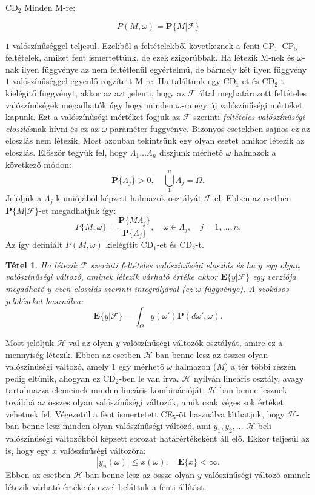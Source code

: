 \documentclass{article}
\newtheorem{theorem}{Tétel}
\begin{document}
CD$_2$ Minden M-re:

\[
 P(M,\omega) = \mathrm{\textbf{P}} \{ M|\mathscr{F}\}
\]

$1$ valószínűséggel teljesül. Ezekből a feltételekből következnek a fenti CP$_1$--CP$_5$ feltételek, amiket fent ismertettünk, de ezek szigorúbbak. Ha létezik M-nek és $\omega$-nak ilyen függvénye az nem feltétlenül egyértelmű, de bármely két ilyen függvény $1$ valószínűséggel egyenlő rögzített M-re. Ha találtunk egy CD$_1$-et és CD$_2$-t kielégítő függvényt, akkor az azt jelenti, hogy az $\mathscr{F}$ által meghatározott feltételes valószínűségek megadhatók úgy hogy minden $\omega$-ra egy új valószínűségi mértéket kapunk. Ezt a valószínűségi mértéket fogjuk az $\mathscr{F}$ szerinti \textit{feltételes valószínűségi eloszlás}nak hívni és ez az $\omega$ paraméter függvénye. Bizonyos esetekben sajnos ez az eloszlás nem létezik. Most azonban tekintsünk egy olyan esetet amikor létezik az eloszlás. Először tegyük fel, hogy $\Lambda_1 \ldots \Lambda_n$ diszjunk mérhető $\omega$ halmazok a következő módon:
\[
	\mathrm{\textbf{P}}\{\Lambda_j\} > 0, \quad \bigcup^{n}_1 \Lambda_j = \Omega .
\]
Jelöljük a $\Lambda_j$-k uniójából képzett halmazok osztályát $\mathscr{F}$-el. Ebben az esetben $\mathrm{\textbf{P}} \{ M|\mathscr{F}\}$-et megadhatjuk így:
\[
	P\{M,\omega\} = \frac{\mathrm{\textbf{P}}\{M\Lambda_j\}}{\mathrm{\textbf{P}}\{\Lambda_j\}}, \quad \omega \in \Lambda_j, \quad j = 1, \ldots , n .
\]
Az így definiált $P(M,\omega)$ kielégítit CD$_1$-et és CD$_2$-t. 
\begin{theorem}\label{th:t9-1}
	Ha létezik $\mathscr{F}$ szerinti feltételes valószínűségi eloszlás és ha $y$ egy olyan valószínűségi változó, aminek létezik várható értéke akkor $\mathrm{\textbf{E}}\{y|\mathscr{F}\}$ egy verziója megadható $y$ ezen eloszlás szerinti integráljával (ez $\omega$ függvénye). A szokásos jelöléseket használva: 
\begin{equation}
	\mathrm{\textbf{E}}\{y | \mathscr{F}\} = \int_{\Omega} y(\omega') \mathrm{\textbf{P}}(d\omega',\omega).
\end{equation}
\end{theorem}
Most jelöljük $\mathscr{H}$-val az olyan $y$ valószínűségi változók osztályát, amire ez a mennyiség létezik. Ebben az esetben $\mathscr{H}$-ban benne lesz az összes olyan valószínűségi változó, amely $1$ egy mérhető $\omega$ halmazon ($M$) a tér többi részén pedig eltűnik, ahogyan ez CD$_2$-ben le van írva. $\mathscr{H}$ nyilván lineáris osztály, avagy tartalmazza elemeinek minden lineáris kombinációját. $\mathscr{H}$-ban benne lesznek továbbá az összes olyan valószínűségi változók, amik csak véges sok értéket vehetnek fel. Végezetül a fent ismertetett CE$_5$-öt használva láthatjuk, hogy $\mathscr{H}$-ban benne lesz minden olyan valószínűségi változó, ami $y_1,y_2,\ldots$ $\mathscr{H}$-beli valószínűségi változókból képzett sorozat határértékeként áll elő. Ekkor teljesül az is, hogy egy $x$ valószínűségi változóra: 
\[
 |y_n(\omega)| \le x(\omega), \quad \mathrm{\textbf{E}}\{x\} < \infty .
\]
Ebben az esetben $\mathscr{H}$-ban benne lesz az össze olyan $y$ valószínűségi változó aminek létezik várható értéke és ezzel beláttuk a fenti állítást. 
\end{document}
